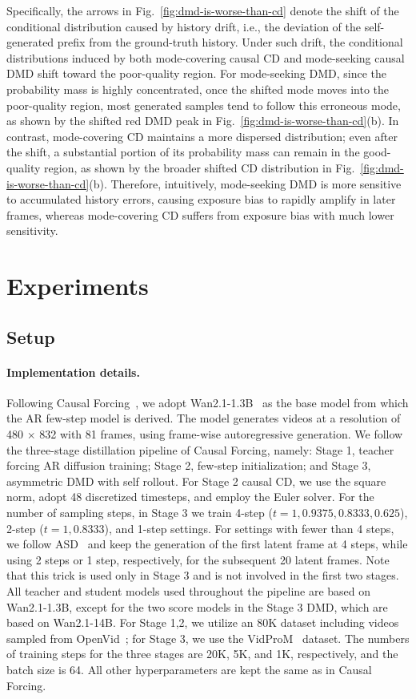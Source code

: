 \documentclass{llmxive}
\begin{document}
Specifically, the arrows in Fig.~\ref{fig:dmd-is-worse-than-cd} denote the shift of the conditional distribution caused by history drift, i.e., the deviation of the self-generated prefix from the ground-truth history. Under such drift, the conditional distributions induced by both mode-covering causal CD and mode-seeking causal DMD shift toward the poor-quality region. For mode-seeking DMD, since the probability mass is highly concentrated, once the shifted mode moves into the poor-quality region, most generated samples tend to follow this erroneous mode, as shown by the shifted red DMD peak in Fig.~\ref{fig:dmd-is-worse-than-cd}(b). In contrast, mode-covering CD maintains a more dispersed distribution; even after the shift, a substantial portion of its probability mass can remain in the good-quality region, as shown by the broader shifted CD distribution in Fig.~\ref{fig:dmd-is-worse-than-cd}(b). Therefore, intuitively, mode-seeking DMD is more sensitive to accumulated history errors, causing exposure bias to rapidly amplify in later frames, whereas mode-covering CD suffers from exposure bias with much lower sensitivity.

\section{Experiments}
\subsection{Setup}
\label{sec: setup}

\paragraph{Implementation details.} Following Causal Forcing~\cite{zhu2026causal}, we adopt Wan2.1-1.3B~\cite{wan2025wan} as the base model from which the AR few-step model is derived. The model generates videos at a resolution of 480 $\times$ 832 with 81 frames, using frame-wise autoregressive generation. We follow the three-stage distillation pipeline of Causal Forcing, namely: Stage 1, teacher forcing AR diffusion training; Stage 2, few-step initialization; and Stage 3, asymmetric DMD with self rollout. For Stage 2 causal CD, we use the square norm, adopt 48 discretized timesteps, and employ the Euler solver.
 For the number of sampling steps, in Stage 3 we train 4-step ($t=1,0.9375,0.8333,0.625$), 2-step ($t=1,0.8333$), and 1-step settings. For settings with fewer than 4 steps, we follow ASD~\cite{yang2025towards} and keep the generation of the first latent frame at 4 steps, while using 2 steps or 1 step, respectively, for the subsequent 20 latent frames. Note that this trick is used only in Stage 3 and is not involved in the first two stages. All teacher and student models used throughout the pipeline are based on Wan2.1-1.3B, except for the two score models in the Stage 3 DMD, which are based on Wan2.1-14B. For Stage 1,2, we utilize an 80K dataset including videos sampled from OpenVid~\cite{nan2024openvid}; for Stage 3, we use the  VidProM~\cite{wang2024vidprom} dataset. The numbers of training steps for the three stages are 20K, 5K, and 1K, respectively, and the batch size is 64. All other hyperparameters are kept the same as in Causal Forcing. 
\end{document}
